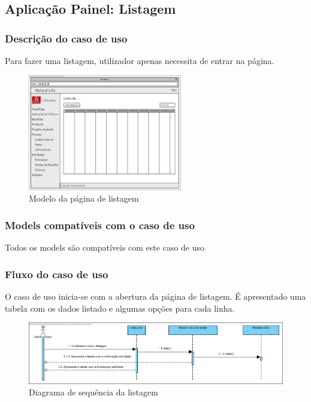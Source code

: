 \subsection{Aplicação Painel: Listagem}
\subsubsection*{Descrição do caso de uso}
Para fazer uma listagem, utilizador apenas necessita de entrar na página. 

\begin{figure}[H] 
	\begin{center}
		\includegraphics[width=0.60\textwidth,keepaspectratio]{figuras/Diagramas_vp/DI_Painel_1_Lista.jpg}
		\caption{Modelo da página de listagem}
		\label{fig:di_lista} 
	\end{center}
\end{figure}

\subsubsection*{Models compatíveis com o caso de uso}
Todos os models são compatíveis com este caso de uso

\subsubsection*{Fluxo do caso de uso}
O caso de uso inicia-se com a abertura da página de listagem. É apresentado uma tabela com os dados listado e algumas opções para cada linha.


\begin{figure}[H] 
	\begin{center}
		\includegraphics[width=\textwidth,keepaspectratio]{figuras/Diagramas_vp/SD_Painel_1_Listar.jpg}
		\caption{Diagrama de sequência da listagem}
		\label{fig:sd_lista} 
	\end{center}
\end{figure}